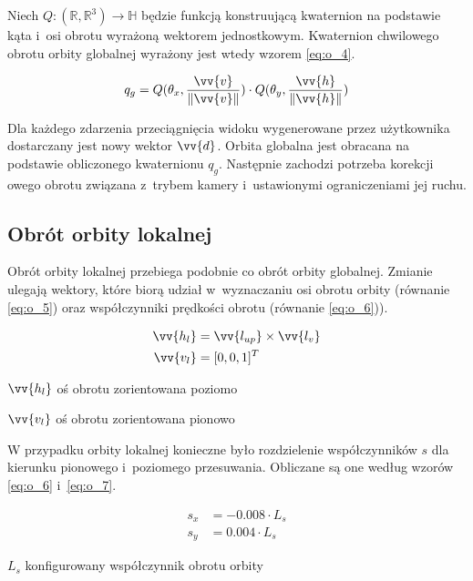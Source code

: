 Niech $Q: (\mathbb{R}, \mathbb{R}^3) \to \mathbb{H}$ będzie funkcją konstruującą kwaternion na podstawie kąta i~osi obrotu wyrażoną wektorem jednostkowym. Kwaternion chwilowego obrotu orbity globalnej wyrażony jest wtedy wzorem \ref{eq:o_4}.

\begin{samepage}
    \begin{equation}
        \label{eq:o_4}
        q_g = Q(\theta_x, \frac{\vv{v}}{\Vert\vv{v}\Vert}) \cdot Q(\theta_y, \frac{\vv{h}}{\Vert\vv{h}\Vert})
    \end{equation}
    \vspace{\baselineskip}
\end{samepage}

Dla każdego zdarzenia przeciągnięcia widoku wygenerowane przez użytkownika dostarczany jest nowy wektor $\vv{d}$. Orbita globalna jest obracana na podstawie obliczonego kwaternionu $q_g$. Następnie zachodzi potrzeba korekcji owego obrotu związana z~trybem kamery i~ustawionymi ograniczeniami jej ruchu. 

\subsection{Obrót orbity lokalnej}
Obrót orbity lokalnej przebiega podobnie co obrót orbity globalnej. Zmianie ulegają wektory, które biorą udział w~wyznaczaniu osi obrotu orbity (równanie \ref{eq:o_5}) oraz współczynniki prędkości obrotu (równanie \ref{eq:o_6})).

\begin{samepage}
    \begin{align}
        \label{eq:o_5}
        \vv{h_l} &= \vv{l_{up}} \times \vv{l_{v}}\\
        \vv{v_l} &= [0, 0, 1]^T
    \end{align}
    \begin{eqexpl}[25mm]
        \item {$\vv{h_l}$} oś obrotu zorientowana poziomo
        \item {$\vv{v_l}$} oś obrotu zorientowana pionowo
    \end{eqexpl}
    \vspace{\baselineskip}
\end{samepage}

W przypadku orbity lokalnej konieczne było rozdzielenie współczynników $s$ dla kierunku pionowego i~poziomego przesuwania. Obliczane są one według wzorów \ref{eq:o_6} i~\ref{eq:o_7}.

\begin{samepage}
    \begin{align}
        \label{eq:o_6}
        s_x &= -0.008 \cdot L_s \\
        \label{eq:o_7}
        s_y &= 0.004 \cdot L_s
    \end{align}
    \begin{eqexpl}[25mm]
        \item {$L_s$} konfigurowany współczynnik obrotu orbity 
    \end{eqexpl}
    \vspace{\baselineskip}
\end{samepage}

